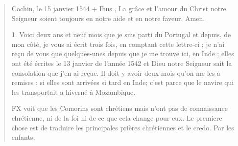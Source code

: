 \begin{quote}
Cochin, le 15 janvier 1544
+
Ihus ,
La grâce et l'amour du Christ notre Seigneur soient toujours en
notre aide et en notre faveur. Amen.


1. Voici deux ans et neuf mois que je suis parti du Portugal et
depuis, de mon côté, je vous ai écrit trois fois, en comptant cette
lettre-ci ; je n'ai reçu de vous que quelques-unes depuis que je me
trouve ici, en Inde ; elles ont été écrites le 13 janvier de l'année
1542 et Dieu notre Seigneur sait la consolation que j'en ai reçue.
Il doit y avoir deux mois qu'on me les a remises ; si elles sont arrivées
si tard en Inde; c'est parce que le navire qui les transportait
a hiverné à Mozambique.
\begin{Synthesis}
 FX voit que les Comorins sont chrétiens mais n'ont pas de connaissance chrétienne, ni de la foi ni de ce que cela change pour eux. Le premiere chose est de traduire les principales prières chrétiennes et le credo.  
 Par les enfants,
\end{Synthesis}


\end{quote}
